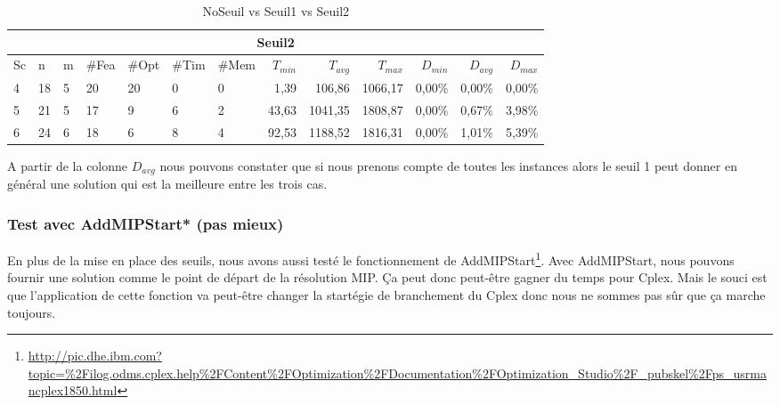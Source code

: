 \documentclass[twoside,fleqn]{EPURapport}
\begin{document}
\begin{table}[h]
    \label{tab_cut2_s1_tab2}
\vspace{2em}
    \begin{tabular}{|l|l|l|l|l|l|l|r|r|r|r|r|r|}
    	\hline
    	\multicolumn{13}{|c|}{Seuil2}\\ \hline
Sc &	n	&m	&\#Fea	&\#Opt	&\#Tim &\#Mem	&$T_{min}$ & $T_{avg}$	& $T_{max}$ & $D_{min}$ & $D_{avg}$	& $D_{max}$ \\ \hline
4&	18&	5&	20&	20&	0&	0&	1,39	&106,86	&1066,17	&0,00\%&	0,00\%&	0,00\%     \\ \hline
5&	21&	5&	17&	9 &	6&	2&	43,63	&1041,35&	1808,87	&0,00\%&	0,67\%&	3,98\%     \\ \hline
6&	24&	6&	18&	6 &	8&	4&	92,53	&1188,52&	1816,31	&0,00\%&	1,01\%&	5,39\%     \\ \hline
    \end{tabular}
    \caption{NoSeuil vs Seuil1 vs Seuil2}
    \label{tab_cut2_s2_tab2}
\end{table}
\bigskip
A partir de la colonne $D_{avg}$ nous pouvons constater que si nous prenons compte de toutes les instances alors le seuil 1 peut donner en général une solution qui est la meilleure entre les trois cas.



\subsubsection{Test avec AddMIPStart* (pas mieux)}
En plus de la mise en place des seuils, nous avons aussi testé le fonctionnement de AddMIPStart\footnote{\url{http://pic.dhe.ibm.com?topic=\%2Filog.odms.cplex.help\%2FContent\%2FOptimization\%2FDocumentation\%2FOptimization_Studio\%2F_pubskel\%2Fps_usrmancplex1850.html}}. Avec AddMIPStart, nous pouvons fournir une solution comme le point de départ de la résolution MIP. Ça peut donc peut-être gagner du temps pour Cplex. Mais le souci est que l'application de cette fonction va peut-être changer la startégie de branchement du Cplex donc nous ne sommes pas sûr que ça marche toujours.
\end{document}
